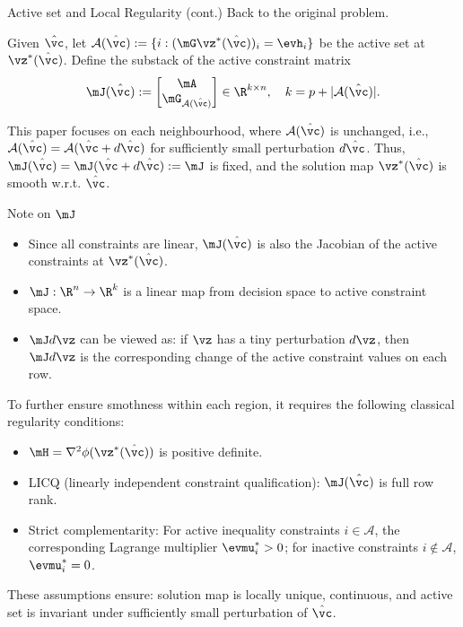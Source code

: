 \documentclass[10pt,aspectratio=169,xcolor=dvipsnames]{beamer}
\begin{document}
\begin{frame}[allowframebreaks]{Active set and Local Regularity (cont.)}
    Back to the original problem.

    \vspace{1em}

     Given $\hat{\vc}$, let $\mathcal{A}(\hat{\vc}) := \{i: (\mG \vz^*(\hat{\vc}))_i = \evh_i\}$ be the active set at $\vz^*(\hat{\vc})$. Define the substack of the active constraint matrix
    $$
    \mJ(\hat{\vc}) := \begin{bmatrix}
        \mA\\
        \mG_{\mathcal{A}(\hat{\vc})}
    \end{bmatrix} \in \R^{k\times n},\quad k = p + |\mathcal{A}(\hat{\vc})|.
    $$


    This paper focuses on each neighbourhood, where $\mathcal{A}(\hat{\vc})$ is unchanged, i.e., $\mathcal{A}(\hat{\vc}) = \mathcal{A}(\hat{\vc} + d\hat{\vc})$ for sufficiently small perturbation $d\hat{\vc}$. Thus, $\mJ(\hat{\vc}) = \mJ(\hat{\vc} + d\hat{\vc}) := \mJ$ is fixed, and the solution map $\vz^*(\hat{\vc})$ is smooth w.r.t. $\hat{\vc}$.


    \begin{block}{\small Note on $\mJ$}
        \begin{itemize}
            \item Since all constraints are linear, $\mJ(\hat{\vc})$ is also the Jacobian of the active constraints at $\vz^*(\hat{\vc})$.
            \item $\mJ: \R^n \to \R^k$ is a linear map from decision space to active constraint space.
            \item $\mJ d\vz$ can be viewed as: if $\vz$ has a tiny perturbation $d\vz$, then $\mJ d\vz$ is the corresponding change of the active constraint values on each row.
        \end{itemize}
    \end{block}

    \break

    To further ensure smothness within each region, it requires the following classical regularity conditions:
    \begin{itemize}
        \item $\mH = \nabla^2 \phi(\vz^*(\hat{\vc}))$ is positive definite.
        \item LICQ (linearly independent constraint qualification): $\mJ(\hat{\vc})$ is full row rank.
        \item Strict complementarity: For active inequality constraints $i \in \mathcal{A}$, the corresponding Lagrange multiplier $\evmu_i^* > 0$; for inactive constraints $i \notin \mathcal{A}$, $\evmu_i^* = 0$.
    \end{itemize}
    These assumptions ensure: solution map is locally unique, continuous, and active set is invariant under sufficiently small perturbation of $\hat{\vc}$.

\end{frame}
\end{document}
